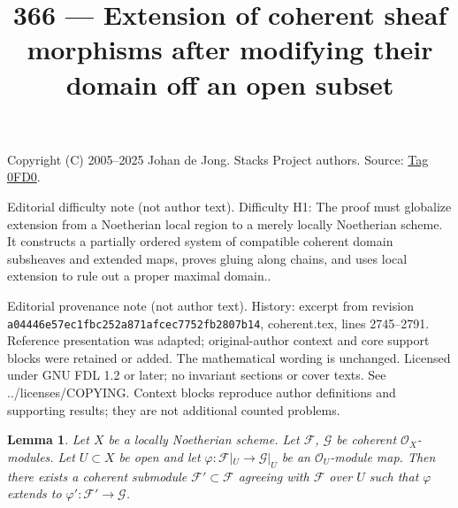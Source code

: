 \documentclass{amsart}
\theoremstyle{plain}
\newtheorem{lemma}[subsection]{Lemma}
\theoremstyle{definition}
\theoremstyle{remark}
\numberwithin{equation}{subsection}
\begin{document}
\title[Stacks Project, Tag 0FD0]{366 --- Extension of coherent sheaf morphisms after modifying their domain off an open subset}
\maketitle
\noindent Copyright (C) 2005--2025 Johan de Jong. Stacks Project authors. Source: \href{https://stacks.math.columbia.edu/tag/0FD0}{Tag 0FD0}.

\noindent Editorial difficulty note (not author text). Difficulty H1: The proof must globalize extension from a Noetherian local region to a merely locally Noetherian scheme. It constructs a partially ordered system of compatible coherent domain subsheaves and extended maps, proves gluing along chains, and uses local extension to rule out a proper maximal domain..

\noindent Editorial provenance note (not author text). History: excerpt from revision \texttt{a0444\allowbreak 6e57e\allowbreak c1fbc\allowbreak 252a8\allowbreak 71afc\allowbreak ec775\allowbreak 2fb28\allowbreak 07b14}, coherent.tex, lines 2745--2791. Reference presentation was adapted; original-author context and core support blocks were retained or added. The mathematical wording is unchanged. Licensed under GNU FDL 1.2 or later; no invariant sections or cover texts. See ../licenses/COPYING. Context blocks reproduce author definitions and supporting results; they are not additional counted problems.

\begin{lemma}
\label{lemma-extend-coherent}
Let $X$ be a locally Noetherian scheme. Let $\mathcal{F}$, $\mathcal{G}$
be coherent $\mathcal{O}_X$-modules. Let $U \subset X$ be open and
let $\varphi : \mathcal{F}|_U \to \mathcal{G}|_U$ be an
$\mathcal{O}_U$-module map. Then there exists a coherent
submodule $\mathcal{F}' \subset \mathcal{F}$ agreeing with
$\mathcal{F}$ over $U$ such that $\varphi$ extends to
$\varphi' : \mathcal{F}' \to \mathcal{G}$.
\end{lemma}
\end{document}
